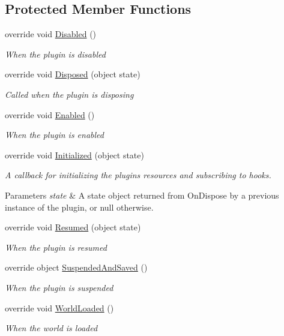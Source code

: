 \subsection*{Protected Member Functions}
\begin{DoxyCompactItemize}
\item 
override void \hyperlink{classOTA_1_1Plugin_1_1LUAPlugin_a98613409d641a4dca656a332b014dbfe}{Disabled} ()
\begin{DoxyCompactList}\small\item\em When the plugin is disabled \end{DoxyCompactList}\item 
override void \hyperlink{classOTA_1_1Plugin_1_1LUAPlugin_ab16fc36a69cb5852555d75ae2e2c4cda}{Disposed} (object state)
\begin{DoxyCompactList}\small\item\em Called when the plugin is disposing \end{DoxyCompactList}\item 
override void \hyperlink{classOTA_1_1Plugin_1_1LUAPlugin_a9a0442ca7538da671562ad2683aaf42b}{Enabled} ()
\begin{DoxyCompactList}\small\item\em When the plugin is enabled \end{DoxyCompactList}\item 
override void \hyperlink{classOTA_1_1Plugin_1_1LUAPlugin_a08973abba6331ff88e59d563aa89f2c5}{Initialized} (object state)
\begin{DoxyCompactList}\small\item\em A callback for initializing the plugin\textquotesingle{}s resources and subscribing to hooks. 
\begin{DoxyParams}{Parameters}
{\em state} & A state object returned from On\+Dispose by a previous instance of the plugin, or null otherwise. \\
\hline
\end{DoxyParams}
\end{DoxyCompactList}\item 
override void \hyperlink{classOTA_1_1Plugin_1_1LUAPlugin_a33e9c25e6ab86fff5e6eb4e9d103eda4}{Resumed} (object state)
\begin{DoxyCompactList}\small\item\em When the plugin is resumed \end{DoxyCompactList}\item 
override object \hyperlink{classOTA_1_1Plugin_1_1LUAPlugin_a7a0f88ea7197b7c72cff81a708c26d21}{Suspended\+And\+Saved} ()
\begin{DoxyCompactList}\small\item\em When the plugin is suspended \end{DoxyCompactList}\item 
override void \hyperlink{classOTA_1_1Plugin_1_1LUAPlugin_a3d93a5293d74c61a3789ff92b8de47d9}{World\+Loaded} ()
\begin{DoxyCompactList}\small\item\em When the world is loaded \end{DoxyCompactList}\end{DoxyCompactItemize}

